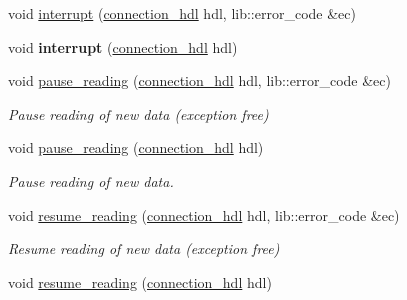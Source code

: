 \begin{DoxyCompactItemize}
void \hyperlink{classwebsocketpp_1_1endpoint_ab6cd8d850c40f33f48d0afb4d7be094c}{interrupt} (\hyperlink{namespacewebsocketpp_a6b3d26a10ee7229b84b776786332631d}{connection\+\_\+hdl} hdl, lib\+::error\+\_\+code \&ec)
\item 
void {\bfseries interrupt} (\hyperlink{namespacewebsocketpp_a6b3d26a10ee7229b84b776786332631d}{connection\+\_\+hdl} hdl)\hypertarget{classwebsocketpp_1_1endpoint_aa77facb47f09c143e5c22486f02bb455}{}\label{classwebsocketpp_1_1endpoint_aa77facb47f09c143e5c22486f02bb455}

\item 
void \hyperlink{classwebsocketpp_1_1endpoint_aef7666b82bf98864b213c3df09298595}{pause\+\_\+reading} (\hyperlink{namespacewebsocketpp_a6b3d26a10ee7229b84b776786332631d}{connection\+\_\+hdl} hdl, lib\+::error\+\_\+code \&ec)
\begin{DoxyCompactList}\small\item\em Pause reading of new data (exception free) \end{DoxyCompactList}\item 
void \hyperlink{classwebsocketpp_1_1endpoint_af7ec27363d0fb1d657a264c4ad853b8e}{pause\+\_\+reading} (\hyperlink{namespacewebsocketpp_a6b3d26a10ee7229b84b776786332631d}{connection\+\_\+hdl} hdl)\hypertarget{classwebsocketpp_1_1endpoint_af7ec27363d0fb1d657a264c4ad853b8e}{}\label{classwebsocketpp_1_1endpoint_af7ec27363d0fb1d657a264c4ad853b8e}

\begin{DoxyCompactList}\small\item\em Pause reading of new data. \end{DoxyCompactList}\item 
void \hyperlink{classwebsocketpp_1_1endpoint_a9753aaade09c9a7a0efd459861ba3b97}{resume\+\_\+reading} (\hyperlink{namespacewebsocketpp_a6b3d26a10ee7229b84b776786332631d}{connection\+\_\+hdl} hdl, lib\+::error\+\_\+code \&ec)
\begin{DoxyCompactList}\small\item\em Resume reading of new data (exception free) \end{DoxyCompactList}\item 
void \hyperlink{classwebsocketpp_1_1endpoint_a4592d2270f56fce0f30a41cd17f77650}{resume\+\_\+reading} (\hyperlink{namespacewebsocketpp_a6b3d26a10ee7229b84b776786332631d}{connection\+\_\+hdl} hdl)\hypertarget{classwebsocketpp_1_1endpoint_a4592d2270f56fce0f30a41cd17f77650}{}\label{classwebsocketpp_1_1endpoint_a4592d2270f56fce0f30a41cd17f77650}


\end{DoxyCompactItemize}
